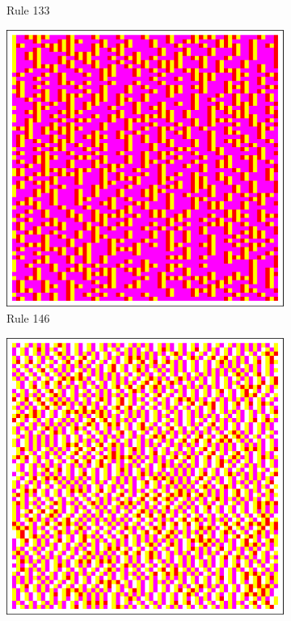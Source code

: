 \documentclass{article}
\begin{document}
\begin{figure}[H]
\begin{subfigure}[b]{0.135\textwidth}
        \vspace{-16pt}\caption*{Rule 133}
        \label{fig:rule-133-center_columns-4096}
    \end{subfigure}
    \begin{subfigure}[b]{0.135\textwidth}
        \centering
        \includegraphics[width=\textwidth]{graphics/behavior/center-columns/rule-146-center_columns-4096.pdf}
        \vspace{-16pt}\caption*{Rule 146}
        \label{fig:rule-146-center_columns-4096}
    \end{subfigure}
    \begin{subfigure}[b]{0.135\textwidth}
        \centering
        \includegraphics[width=\textwidth]{graphics/behavior/center-columns/rule-154-center_columns-4096.pdf}

\end{subfigure}
\end{figure}
\end{document}
